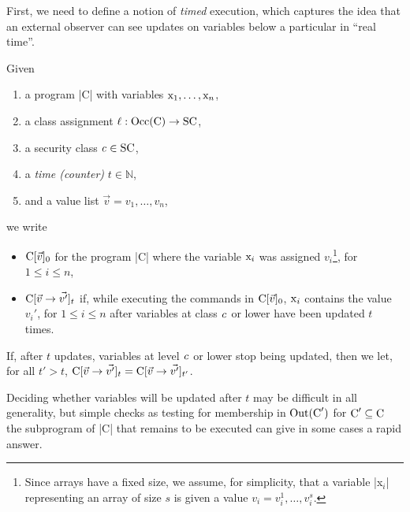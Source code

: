 First, we need to define a notion of \emph{timed} execution, which captures the
idea that an external observer can see updates on variables below a particular
 in \enquote{real time}.

\begin{definition}
Given
\begin{enumerate}
\item a program \prc|C| with variables \(\prc|x|_1, \hdots,
\prc|x|_n\),
\item a class assignment \(\ell : \Occ(\prc|C|) \to
\SC\),
\item a security class \(\mathit{c} \in \mathrm{SC}\),
\item a \emph{time (counter)} \(t \in \mathbb{N}\),
\item and a value list \(\vec{v} = v_1, \hdots, v_n\),
\end{enumerate}
we write
\begin{itemize}

\item \(\prc|C|[\vec{v}]_0\) for the program
\prc|C| where the variable \ensuremath{\prc|x$_i$|} was
assigned \(v_i\)\footnote{Since arrays have a fixed size, we assume, for
simplicity, that a variable \prc|x$_i$| representing an array of size $s$ is
given a value $v_i = v_i^1, \hdots, v_i^s$.}, for \(1 \leqslant i \leqslant n\),

\item  \(\prc|C|[\vec{v} \rightarrow \vec{v'}]_t\) if, while
executing the commands in \(\prc|C|[\vec{v}]_0\), \ensuremath{\prc|x$_i$|}
contains the value \(v_i'\), for \(1 \leqslant i \leqslant n\) after variables
at class \(\mathit{c}\) or lower have been updated \(t\) times.

\end{itemize}
If, after \(t\) updates, variables at level
\(\mathit{c}\) or lower stop being updated, then we let, for all \(t'
> t\), \(\prc|C|[\vec{v} \rightarrow \vec{v'}]_t = \prc|C|[\vec{v}
\rightarrow \vec{v'}]_{t'}\).
\end{definition}

Deciding whether variables will be updated after \(t\) may be
difficult in all generality, but simple checks as \eg testing for membership in
\(\Out(\prc|C|')\) for \(\prc|C|' \subseteq
\prc|C|\) the subprogram of \prc|C| that remains to be executed can
give in some cases a rapid answer.


